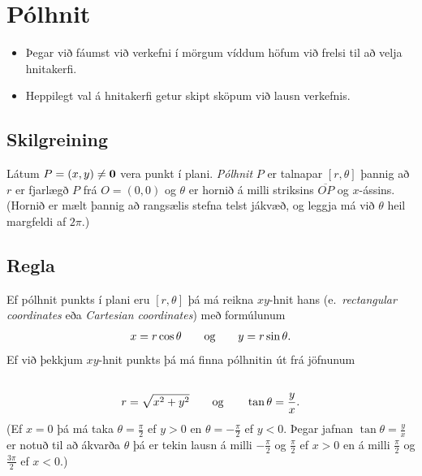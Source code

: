 \documentclass[a4paper,10pt,icelandic]{sphinxmanual}
\begin{document}
\section{Pólhnit}
\label{Kafli1:polhnit}\begin{itemize}
\item {} 
Þegar við fáumst við verkefni í mörgum víddum höfum við frelsi til að
velja hnitakerfi.

\item {} 
Heppilegt val á hnitakerfi getur skipt sköpum við lausn verkefnis.

\end{itemize}


\subsection{Skilgreining}
\label{Kafli1:id8}\label{Kafli1:index-8}
Látum \(P=(x,y)\neq \mbox{${\bf 0}$}\) vera punkt í plani. \emph{Pólhnit}
\(P\) er talnapar \([r,\theta]\) þannig að \(r\) er fjarlægð
\(P\) frá \(O=(0,0)\) og \(\theta\) er hornið á milli
striksins \(\overline{OP}\) og \(x\)-ássins. (Hornið er mælt
þannig að rangsælis stefna telst jákvæð, og leggja má við \(\theta\)
heil margfeldi af \(2\pi\).)


\subsection{Regla}
\label{Kafli1:id9}
Ef pólhnit punkts í plani eru \([r, \theta]\) þá má reikna
\(xy\)-hnit hans (e. \emph{rectangular coordinates} eða \emph{Cartesian
coordinates}) með formúlunum
\begin{gather}
\begin{split}\displaystyle x=r\cos\theta \qquad\mbox{og}\qquad y=r\sin\theta.\end{split}\notag
\end{gather}
Ef við þekkjum \(xy\)-hnit punkts þá má finna pólhnitin út frá
jöfnunum
\begin{gather}
\begin{split}\displaystyle\end{split}\notag\\\begin{split}r=\sqrt{x^2+y^2}\qquad\mbox{og}
\qquad \tan\theta=\frac{y}{x}.\end{split}\notag
\end{gather}
(Ef \(x=0\) þá má taka \(\theta=\frac{\pi}{2}\) ef \(y>0\)
en \(\theta=-\frac{\pi}{2}\) ef \(y<0\). Þegar jafnan
\(\tan\theta=\frac{y}{x}\) er notuð til að ákvarða \(\theta\) þá
er tekin lausn á milli \(-\frac{\pi}{2}\) og \(\frac{\pi}{2}\)
ef \(x>0\) en á milli \(\frac{\pi}{2}\) og
\(\frac{3\pi}{2}\) ef \(x<0\).)
\end{document}
